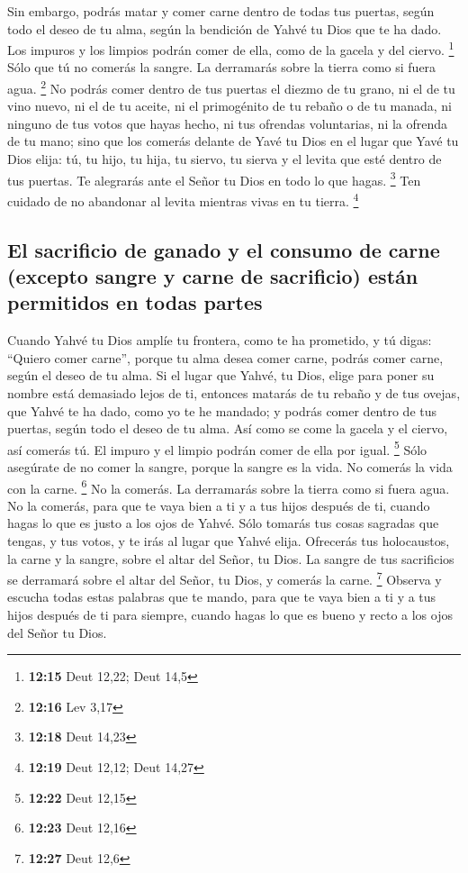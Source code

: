 \begin{paracol}{2}
 Sin embargo, podrás matar y comer carne dentro de todas
tus puertas, según todo el deseo de tu alma, según la bendición de Yahvé
tu Dios que te ha dado. Los impuros y los limpios podrán comer de ella,
como de la gacela y del ciervo. \footnote{\textbf{12:15} Deut 12,22;
  Deut 14,5}  Sólo que tú no comerás la sangre. La
derramarás sobre la tierra como si fuera agua. \footnote{\textbf{12:16}
  Lev 3,17}  No podrás comer dentro de tus puertas el
diezmo de tu grano, ni el de tu vino nuevo, ni el de tu aceite, ni el
primogénito de tu rebaño o de tu manada, ni ninguno de tus votos que
hayas hecho, ni tus ofrendas voluntarias, ni la ofrenda de tu mano;
 sino que los comerás delante de Yavé tu Dios en el lugar
que Yavé tu Dios elija: tú, tu hijo, tu hija, tu siervo, tu sierva y el
levita que esté dentro de tus puertas. Te alegrarás ante el Señor tu
Dios en todo lo que hagas. \footnote{\textbf{12:18} Deut 14,23}
 Ten cuidado de no abandonar al levita mientras vivas en
tu tierra. \footnote{\textbf{12:19} Deut 12,12; Deut 14,27}

\hypertarget{el-sacrificio-de-ganado-y-el-consumo-de-carne-excepto-sangre-y-carne-de-sacrificio-estuxe1n-permitidos-en-todas-partes}{%
\subsection{El sacrificio de ganado y el consumo de carne (excepto
sangre y carne de sacrificio) están permitidos en todas
partes}\label{el-sacrificio-de-ganado-y-el-consumo-de-carne-excepto-sangre-y-carne-de-sacrificio-estuxe1n-permitidos-en-todas-partes}}

 Cuando Yahvé tu Dios amplíe tu frontera, como te ha
prometido, y tú digas: ``Quiero comer carne'', porque tu alma desea
comer carne, podrás comer carne, según el deseo de tu alma.
 Si el lugar que Yahvé, tu Dios, elige para poner su
nombre está demasiado lejos de ti, entonces matarás de tu rebaño y de
tus ovejas, que Yahvé te ha dado, como yo te he mandado; y podrás comer
dentro de tus puertas, según todo el deseo de tu alma. 
Así como se come la gacela y el ciervo, así comerás tú. El impuro y el
limpio podrán comer de ella por igual. \footnote{\textbf{12:22} Deut
  12,15}  Sólo asegúrate de no comer la sangre, porque la
sangre es la vida. No comerás la vida con la carne. \footnote{\textbf{12:23}
  Deut 12,16}  No la comerás. La derramarás sobre la
tierra como si fuera agua.  No la comerás, para que te
vaya bien a ti y a tus hijos después de ti, cuando hagas lo que es justo
a los ojos de Yahvé.  Sólo tomarás tus cosas sagradas que
tengas, y tus votos, y te irás al lugar que Yahvé elija. 
Ofrecerás tus holocaustos, la carne y la sangre, sobre el altar del
Señor, tu Dios. La sangre de tus sacrificios se derramará sobre el altar
del Señor, tu Dios, y comerás la carne. \footnote{\textbf{12:27} Deut
  12,6}  Observa y escucha todas estas palabras que te
mando, para que te vaya bien a ti y a tus hijos después de ti para
siempre, cuando hagas lo que es bueno y recto a los ojos del Señor tu
Dios.


\end{paracol}
